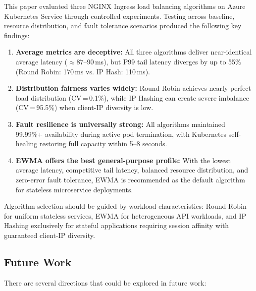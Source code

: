 \documentclass[conference]{IEEEtran}
\begin{document}
This paper evaluated three NGINX Ingress load balancing algorithms on Azure Kubernetes Service through controlled experiments. Testing across baseline, resource distribution, and fault tolerance scenarios produced the following key findings:

\begin{enumerate}
    \item \textbf{Average metrics are deceptive:} All three algorithms deliver near-identical average latency ($\approx$87--90\,ms), but P99 tail latency diverges by up to 55\% (Round Robin: 170\,ms vs. IP Hash: 110\,ms).
    \item \textbf{Distribution fairness varies widely:} Round Robin achieves nearly perfect load distribution (CV\,=\,0.1\%), while IP Hashing can create severe imbalance (CV\,=\,95.5\%) when client-IP diversity is low.
    \item \textbf{Fault resilience is universally strong:} All algorithms maintained 99.99\%+ availability during active pod termination, with Kubernetes self-healing restoring full capacity within 5--8 seconds.
    \item \textbf{EWMA offers the best general-purpose profile:} With the lowest average latency, competitive tail latency, balanced resource distribution, and zero-error fault tolerance, EWMA is recommended as the default algorithm for stateless microservice deployments.
\end{enumerate}

Algorithm selection should be guided by workload characteristics: Round Robin for uniform stateless services, EWMA for heterogeneous API workloads, and IP Hashing exclusively for stateful applications requiring session affinity with guaranteed client-IP diversity.

\subsection{Future Work}

There are several directions that could be explored in future work:
\end{document}
